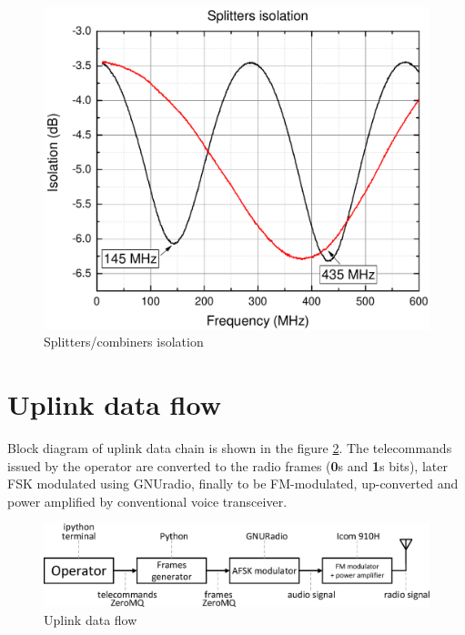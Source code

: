 \begin{figure}
    \centering
    \includegraphics[width=0.6\paperwidth]{img/7/splitter_isolation.pdf}
    \caption{Splitters/combiners isolation}
    \label{splitter_isolation}
\end{figure}




\section{Uplink data flow}
Block diagram of uplink data chain is shown in the figure \ref{uplink_data_flow}. The telecommands issued by the operator are converted to the radio frames (\textbf{0}s and \textbf{1}s bits), later FSK modulated using GNUradio, finally to be FM-modulated, up-converted and power amplified by conventional voice transceiver.

\begin{figure}
    \centering
    \includegraphics[width=0.6\paperwidth]{img/7/uplink_data_flow.eps}
    \caption{Uplink data flow}
    \label{uplink_data_flow}
\end{figure}

